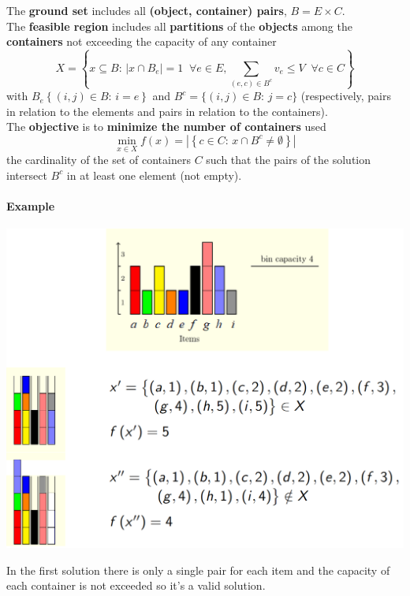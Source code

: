 \documentclass[11pt]{article}
\begin{document}
	The \textbf{ground set} includes all \textbf{(object, container) pairs}, $B = E \times C$.\\
	
	The \textbf{feasible region} includes all \textbf{partitions} of the \textbf{objects} among the \textbf{containers} not exceeding the capacity of any container
	$$ X = \left\{ x \subseteq B : \, |x \cap B_e| = 1 \;\; \forall e \in E, \sum_{(e,c) \in B^c} v_e \leq V \;\; \forall c \in C \right\}$$
	with $B_e \left\{(i,j) \in B : \, i = e\right\}$ and $B^c = \{(i,j) \in B : \, j = c \}$ (respectively, pairs in relation to the elements and pairs in relation to the containers).\\
	
	The \textbf{objective} is to \textbf{minimize the number of containers} used
	$$ \min_{x \in X} f(x) = \left| \left\{c \in C : \, x \cap B^c \neq \emptyset \right\}\right| $$
	the cardinality of the set of containers $C$ such that the pairs of the solution intersect $B^c$ in at least one element (not empty).\\
	
	\newpage
	
	\paragraph{Example}
	\begin{center}
		\includegraphics[width=\columnwidth]{img/BPP1}
	\end{center}
	In the first solution there is only a single pair for each item and the capacity of each container is not exceeded so it's a valid solution.
	
\end{document}
